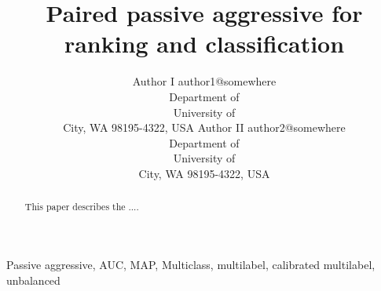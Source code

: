 \documentclass[twoside,11pt]{article}
\begin{document}
\title{Paired passive aggressive for ranking and classification}

\author{       \name Author I \email author1@somewhere \\
       \addr Department of \\
       University of \\
       City, WA 98195-4322, USA
       \AND
       \name Author II \email author2@somewhere \\
       \addr Department of \\
       University of \\
       City, WA 98195-4322, USA
       }

\maketitle

\begin{abstract}%
This paper describes the ....
\end{abstract}

\begin{keywords}
  Passive aggressive, AUC, MAP, Multiclass, multilabel, calibrated multilabel, unbalanced
\end{keywords}












\newpage

\appendix





\vskip 0.2in

\end{document}
